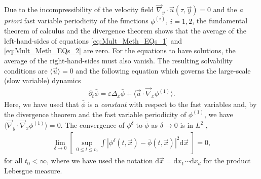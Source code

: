 \documentclass[11pt]{amsart}
\renewcommand{\d}{\mathrm{d}}
\begin{document}
Due to the incompressibility of the velocity field
$\vec{\nabla}_y\cdot\vec{u}(\tau,\vec{y})=0$ and the \emph{a priori} fast variable
periodicity of the functions $\phi^{(i)}$, $i=1,2$,  the
fundamental theorem of calculus and the divergence theorem shows that
the average of the left-hand-sides of equations
\eqref{eq:Mult_Meth_EQs_1} and \eqref{eq:Mult_Meth_EQs_2} are
zero. For the equations to have solutions, the average of the
right-hand-sides must also vanish.
The resulting solvability conditions are $\langle\vec{u}\rangle=0$
and the following equation which governs the large-scale (slow
variable) dynamics   
%
\begin{align}\label{eq:Avg_EQ_phi}
  \partial_t\bar{\phi}=\varepsilon\Delta_x\bar{\phi}+\langle\vec{u}\cdot\vec{\nabla}_x\phi^{(1)}\rangle.
\end{align}
%
Here, we have used that $\bar{\phi}$ is a \emph{constant} with respect to
the fast variables and, by the divergence theorem and the fast
variable periodicity of $\phi^{(1)}$, we have
$\langle\vec{\nabla}_y\cdot\vec{\nabla}_x\phi^{(1)}\rangle=0$. The convergence of $\phi^\delta$ to $\bar{\phi}$ as
$\delta\to0$ is in $L^2$ \cite{Fannjiang:SIAM_JAM:333},  
%
\begin{align}
  \lim_{\delta\to0}\left[\,\sup_{0\leq t\leq t_0}
    \int\left|\phi^\delta(t,\vec{x})-\bar{\phi}(t,\vec{x})\right|^2\d\vec{x}
    \;\right]=0,
\end{align}
%
for all $t_0<\infty$, where we have used the notation $\d\vec{x}=\d x_1\cdots \d
x_d$ for the product Lebesgue measure.
\end{document}
